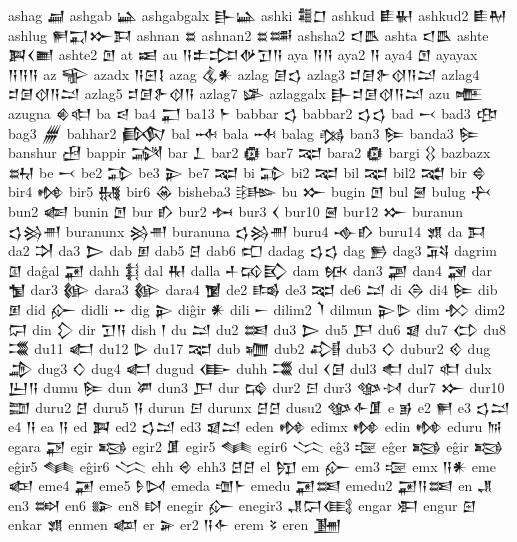  ashag  𒃷   
 ashgab  𒀿   
 ashgabgalx  𒃲𒀿    
 ashki  𒍤𒆸    
 ashkud  𒀾𒈽    
 ashkud2  𒀾𒈹    
 ashlug  𒂍𒍑𒁍𒁕    
 ashnan  𒊺   
 ashnan2  𒊺𒌁    
 ashsha2  𒃰𒋺    
 ashta  𒃰𒋺    
 ashte  𒀉𒌋𒆤    
 ashte2  𒆹   
 at  𒀜   
 au  𒀀𒉺𒄐𒉻𒋛𒀀    
 aya  𒀀𒀀    
 aya2  𒀀   
 aya4  𒆹   
 ayayax  𒀀𒀀𒀀    
 az  𒊍   
 azadx  𒀀𒇉𒋙    
 azag  𒆬𒀭    
 azlag  𒌆𒌓    
 azlag3  𒄑𒌆𒉿𒋼𒀀𒁺    
 azlag4  𒄑𒌆𒋼𒀀𒁺    
 azlag5  𒄑𒌆𒉿𒋼𒀀    
 azlag7  𒈐   
 azlaggalx  𒃲𒄑𒌆𒋼𒀀𒁺    
 azu  𒍬   
 azugna  𒄯𒊕    
 ba  𒁀   
 ba4  𒂷   
 ba13  𒈨   
 babbar  𒌓   
 babbar2  𒌓𒌓    
 bad  𒁁   
 bad3  𒂦   
 bag3  𒁂   
 bahhar2  𒁃   
 bal  𒁄   
 bala  𒁄   
 balag  𒁆   
 ban3  𒌉   
 banda3  𒌉   
 banshur  𒍎   
 bappir  𒋋   
 bar  𒁇   
 bar2  𒁈   
 bar7  𒉈   
 bara2  𒁈   
 bargi  𒌐   
 bazbazx  𒊻   
 be  𒁁   
 be2  𒁉   
 be3  𒉌   
 be7  𒉈   
 bi  𒁉   
 bi2  𒉈   
 bil  𒉈   
 bil2  𒉋   
 bir  𒄵   
 bir4  𒂔   
 bir5  𒉆   
 bir6  𒊶   
 bisheba3  𒄡   
 bu  𒁍   
 bugin  𒆹   
 bul  𒇧   
 bulug  𒁑   
 bun2  𒅮   
 bunin  𒆹   
 bur  𒁓   
 bur2  𒁔   
 bur3  𒌋   
 bur10  𒇧   
 bur12  𒁍   
 buranun  𒌓𒄒𒉣    
 buranunx  𒄒𒉣    
 buranuna  𒌓𒄒𒉣    
 buru4  𒉢𒁓    
 buru14  𒂙   
 da  𒁕   
 da2  𒋫   
 da3  𒆕   
 dab  𒁳   
 dab5  𒆪   
 dab6  𒍏   
 dadag  𒌓𒌓    
 dag  𒁖   
 dag3  𒍴
 dagrim  𒇑
 daĝal 𒂼 
 dahh  𒈭   
 dal  𒊑   
 dalla  𒈦𒄘𒃼    
 dam  𒁮   
 dan3  𒃩   
 dan4  𒃋   
 dar  𒁯   
 dar3  𒁰   
 dara3  𒁰   
 dara4  𒁱   
 de2  𒌤   
 de3  𒉈   
 de6  𒁺   
 di  𒁲   
 di4  𒌉   
 dib  𒁳   
 did  𒅎   
 didli  𒐀   
 dig  𒉌   
 diĝir  𒀭   
 dili  𒀸   
 dilim2  𒇺   
 dilmun  𒉌𒌇    
 dim  𒁴   
 dim2  𒁶   
 din  𒁷   
 dir  𒋛𒀀    
 dish  𒁹   
 du  𒁺   
 du2  𒌅   
 du3  𒆕   
 du5  𒂅   
 du6  𒇯   
 du7  𒌌   
 du8  𒂃   
 du11  𒅗   
 du12  𒌇   
 du17  𒉈   
 dub  𒁾   
 dub2  𒂀   
 dub3  𒄭   
 dubur2  𒄶   
 dug  𒂁   
 dug3  𒄭   
 dug4  𒅗   
 dugud  𒂂   
 duhh  𒂃   
 dul  𒌋𒌆    
 dul3  𒊨   
 dul7  𒊕   
 dulx  𒌨𒀀       
 dumu  𒌉   
 dun  𒂄   
 dun3  𒂅   
 dur  𒄙   
 dur2  𒂉   
 dur3  𒀲𒀴    
 dur7  𒁍   
 dur10  𒊿   
 duru2  𒆪   
 duru5  𒀀   
 durun  𒂉   
 durunx  𒆪𒆪    
 dusu2  𒀲𒅆𒂠    
 e  𒂊   
 e2  𒂍   
 e3  𒌓𒁺    
 e4  𒀀   
 ea  𒀀   
 ed  𒀉   
 ed2  𒌓𒁺    
 ed3  𒇯𒁺    
 eden  𒂔   
 edimx  𒂔   
 edin  𒂔   
 eduru  𒀁   
 egara  𒃌   
 egir  𒂕   
 egir2  𒂠   
 egir5  𒈝   
 egir6  𒈱   
 eĝ3  𒉘   
 eĝer  𒂕   
 eĝir  𒂕   
 eĝir5  𒈝   
 eĝir6  𒈱   
 ehh  𒄴   
 ehh3  𒆪𒆪    
 el  𒂖   
 em  𒅎   
 em3  𒉘   
 emx  𒀀𒀭    
 eme  𒅴   
 eme4  𒂼   
 eme5  𒊩𒄸    
 emeda  𒌝𒈨    
 emedu  𒂼𒌅    
 emedu2  𒂼𒀀𒌅    
 en  𒂗   
 en3  𒇷   
 en6  𒅔   
 en8  𒊭   
 enegir  𒅎   
 enegir3  𒂗𒁶𒍼    
 engar  𒀳   
 engur  𒇉   
 enkar  𒂙   
 enmen  𒆉   
 er  𒅕   
 er2  𒀀𒅆    
 erem  𒂟   
 eren  𒂞   
